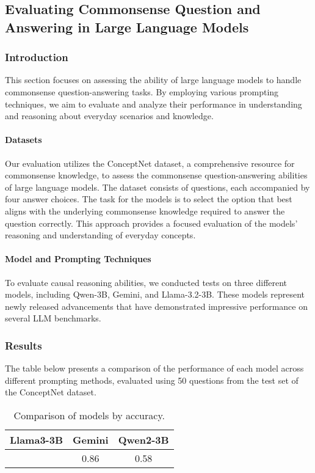 \subsection{Evaluating Commonsense Question and Answering in Large Language Models}

\subsubsection{Introduction}
This section focuses on assessing the ability of large language models to handle commonsense question-answering tasks. By employing various prompting techniques, we aim to evaluate and analyze their performance in understanding and reasoning about everyday scenarios and knowledge.

\paragraph{Datasets}
Our evaluation utilizes the ConceptNet dataset, a comprehensive resource for commonsense knowledge, to assess the commonsense question-answering abilities of large language models. The dataset consists of questions, each accompanied by four answer choices. The task for the models is to select the option that best aligns with the underlying commonsense knowledge required to answer the question correctly. This approach provides a focused evaluation of the models' reasoning and understanding of everyday concepts.


\paragraph{Model and Prompting Techniques} 
To evaluate causal reasoning abilities, we conducted tests on three different models, including Qwen-3B, Gemini, and Llama-3.2-3B. These models represent newly released advancements that have demonstrated impressive performance on several LLM benchmarks.

\subsubsection{Results}
The table below presents a comparison of the performance of each model across different prompting methods, evaluated using 50 questions from the test set of the ConceptNet dataset.

\begin{table}[ht]
  \centering
  \begin{tabular}{|c|c|c|}
      \hline
      \textbf{Llama3-3B}    & \textbf{Gemini} & \textbf{Qwen2-3B} \\ \hline

         & 0.86 & 0.58\\ \hline 

  \end{tabular}
  \caption{Comparison of models by accuracy.}
  \label{tab:model_comparison}
\end{table}
